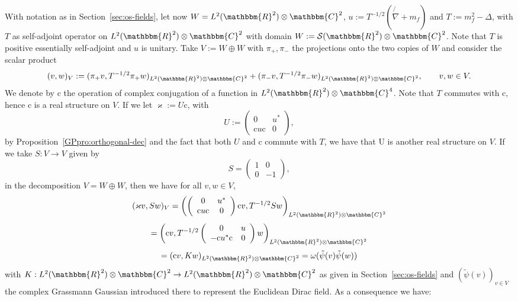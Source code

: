 \documentclass[11pt]{article}
\newcommand{\assign}{:=}
\begin{document}
With notation as in Section~\ref{sec:os-fields}, let now $W = L^2
(\mathbbm{R}^2) \otimes \mathbbm{C}^2$, $u \assign T^{- 1 / 2} \left(
\not{\nabla} + m_f \right)$ and $T \assign m_f^2 - \Delta$, with $T$ as
self-adjoint operator on $L^2 (\mathbbm{R}^2) \otimes \mathbbm{C}^2$ with domain
$W \assign \mathcal{S} (\mathbbm{R}^2) \otimes \mathbbm{C}^2$. Note that $T$ is
positive essentially self-adjoint and $u$ is unitary. Take $V \assign W \oplus
W$ with $\pi_+, \pi_-$ the projections onto the two copies of $W$ and consider
the scalar product
\[ (v, w)_V \assign (\pi_+ v, T^{- 1 / 2} \pi_+ w)_{L^2 (\mathbbm{R}^2) \otimes
   \mathbbm{C}^2} + (\pi_- v, T^{- 1 / 2} \pi_- w)_{L^2 (\mathbbm{R}^2) \otimes
   \mathbbm{C}^2}, \qquad v, w \in V. \]
We denote by $\mathrm{c}$ the operation of complex conjugation of a function
in $L^2 (\mathbbm{R}^2) \otimes \mathbbm{C}^4$. Note that $T$ commutes with
$\mathrm{c}$, hence $\mathrm{c}$ is a real structure on $V$. If we let
$\varkappa \assign U\mathrm{c}$, with
\[ U \assign \left( \begin{array}{cc}
     0 & u^{\ast}\\
     \mathrm{c}u\mathrm{c} & 0
   \end{array} \right), \]
by Proposition~\ref{GPpro:orthogonal-dec} and the fact that both $U$ and
$\mathrm{c}$ commute with $T$, we have that $\mathrm{U}$ is another real
structure on $V$. If we take $S : V \rightarrow V$ given by
\begin{equation}
  S = \left(\begin{array}{cc}
    1 & 0\\
    0 & - 1
  \end{array}\right), \label{eq:S-diag}
\end{equation}
in the decomposition $V = W \oplus W$, then we have for all $v, w \in V$,
\[ (\varkappa v, S w)_V = \left( \left( \begin{array}{cc}
     0 & u^{\ast}\\
     \mathrm{c}u\mathrm{c} & 0
   \end{array} \right) \mathrm{c}v, T^{- 1 / 2} S w \right)_{L^2
   (\mathbbm{R}^2) \otimes \mathbbm{C}^2} \]
\[ = \left( \mathrm{c}v, T^{- 1 / 2} \left( \begin{array}{cc}
     0 & u\\
     -\mathrm{c}u^{\ast} \mathrm{c} & 0
   \end{array} \right) w \right)_{L^2 (\mathbbm{R}^2) \otimes \mathbbm{C}^2} \]
\[ = (\mathrm{c}v, K w)_{L^2 (\mathbbm{R}^2) \otimes \mathbbm{C}^2} = \omega
   (\tilde{\psi} (v) \tilde{\psi} (w)) \]
with $K : L^2 (\mathbbm{R}^2) \otimes \mathbbm{C}^2 \rightarrow L^2
(\mathbbm{R}^2) \otimes \mathbbm{C}^2$ as given in Section~\ref{sec:os-fields}
and $(\tilde{\psi} (v))_{v \in V}$ the complex Grassmann Gaussian introduced
there to represent the Euclidean Dirac field. As a consequence we have:
\end{document}
